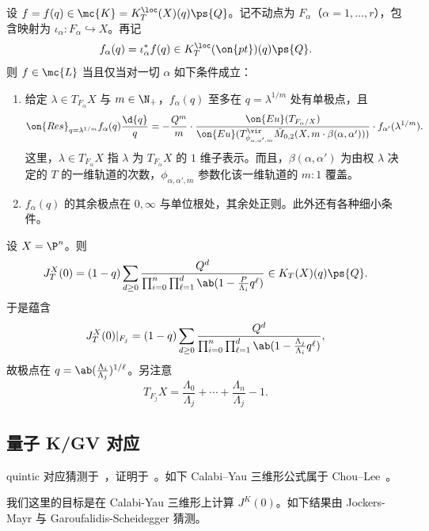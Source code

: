 设 \(f = f(q) \in \mc{K} = K_T^{\loc}(X)(q)\ps{Q}\)。记不动点为 \(F_{\alpha}\)（\(\alpha = 1, \ldots, r\)），包含映射为 \(\iota_{\alpha} \colon F_{\alpha} \hookrightarrow X\)。再记
\[ f_{\alpha}(q) = \iota_{\alpha}^* f(q) \in K_T^{\loc}(\on{pt})(q)\ps{Q}. \]
则 \(f \in \mc{L}\) 当且仅当对一切 \(\alpha\) 如下条件成立：
\begin{enumerate}
    \item 给定 \(\lambda \in T_{F_{\alpha}} X\) 与 \(m \in \N_+\)，\(f_{\alpha}(q)\) 至多在 \(q = \lambda^{1/m}\) 处有单极点，且
        \[ \on{Res}_{q = \lambda^{1/m}} f_{\alpha}(q) \frac{\d{q}}{q} = -\frac{Q^m}{m} \cdot \frac{\on{Eu}(T_{F_{\alpha}/X})}{\on{Eu}(T^{\vir}_{\phi_{\alpha,\alpha',m}}\bar{M}_{0,2}(X, m \cdot \beta(\alpha, \alpha')))} \cdot f_{\alpha'}(\lambda^{1/m}). \]
        这里，\(\lambda \in T_{F_{\alpha}}X\) 指 \(\lambda\) 为 \(T_{F_{\alpha}} X\) 的 \(1\) 维子表示。而且，\(\beta(\alpha,\alpha')\) 为由权 \(\lambda\) 决定的 \(T\) 的一维轨道的次数，\(\phi_{\alpha, \alpha', m}\) 参数化该一维轨道的 \(m:1\) 覆盖。
    \item \(f_{\alpha}(q)\) 的其余极点在 \(0, \infty\) 与单位根处，其余处正则。此外还有各种细小条件。
\end{enumerate}

\begin{exm}
    设 \(X = \P^n\)。则
    \[ J_T^X(0) = (1-q) \sum_{d \geq 0} \frac{Q^d}{\prod_{i=0}^n \prod_{\ell = 1}^d \ab(1 - \frac{P}{\Lambda_i} q^{\ell})} \in K_T(X)(q) \ps{Q}. \]
    于是蕴含
    \[ J_T^X(0) |_{F_j} = (1-q) \sum_{d \geq 0} \frac{Q^d}{\prod_{i=0}^n \prod_{\ell = 1}^d \ab(1 - \frac{\Lambda_j}{\Lambda_i}q^{\ell})}, \]
    故极点在 \(q = \ab(\frac{\Lambda_i}{\Lambda_j})^{1/\ell}\)。另注意
    \[ T_{F_j} X = \frac{\Lambda_0}{\Lambda_j} + \cdots + \frac{\Lambda_n}{\Lambda_j} - 1. \]
\end{exm}

\subsection{量子 K/GV 对应}%
\label{sub:Quantum K/GV correspondence}

quintic 对应猜测于~\cite{GaroufalidisScheidegger2022}，证明于~\cite{ChouLeeQuintic}。如下 Calabi--Yau 三维形公式属于 Chou--Lee~\cite{ChouLee2025}。

我们这里的目标是在 Calabi-Yau 三维形上计算 \(J^K(0)\)。如下结果由 Jockers-Mayr 与 Garoufalidis-Scheidegger 猜测。

